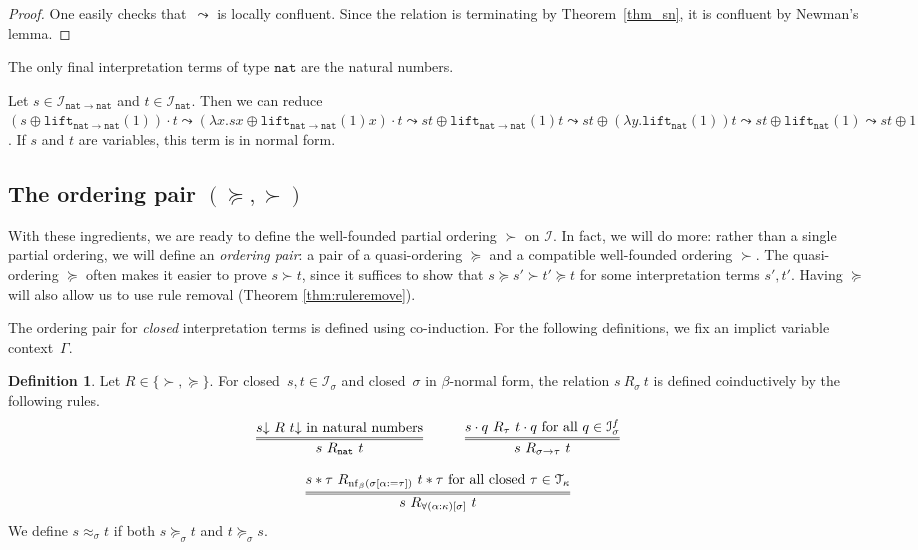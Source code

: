 \documentclass[a4paper,UKenglish,cleveref,autoref,numberwithinsect]{lipics-v2019}
\theoremstyle{definition}
\newtheorem{defn}[theorem]{Definition}
\newcommand{\Iterms}{\mathcal{I}}
\newcommand{\arrtype}{\rightarrow}
\newcommand{\app}[2]{#1 \cdot #2}
\newcommand{\tapp}[2]{#1 * #2}
\newcommand{\subst}[2]{#1:=#2}
\newcommand{\abs}[2]{\lambda #1.#2}
\newcommand{\arrW}{\leadsto}
\newcommand{\nat}{\mathtt{nat}}
\newcommand{\lift}{\mathtt{lift}}
\newcommand{\Tc}{\mathcal{T}}
\newcommand{\nf}{\mathrm{nf}}
\newcommand{\da}{\mathord{\downarrow}}
\begin{document}
\begin{proof}
  One easily
  checks that~$\arrW$ is locally confluent. Since the
  relation is
  terminating by Theorem~\ref{thm_sn}, it is confluent by Newman's
  lemma.
\end{proof}

\begin{lemma}\label{lem_final_nat}
  The only final interpretation terms of type $\nat$ are the natural
  numbers.
\end{lemma}

\begin{example}\label{ex:arrWreduce}
Let $s \in \Iterms_{\nat \arrtype \nat}$ and $t \in
\Iterms_\nat$. Then we can reduce
$(s \oplus \lift_{\nat \arrtype \nat}(1)) \cdot t \arrW
(\abs{x}{s x \oplus \lift_{\nat \arrtype \nat}(1)x}) \cdot t \arrW
s t \oplus \lift_{\nat \arrtype \nat}(1)t \arrW
s t \oplus (\abs{y}{\lift_{\nat}(1)})t \arrW
s t \oplus \lift_\nat(1) \arrW
s t \oplus 1$. If $s$ and $t$ are variables, this term is in normal
form.
\end{example}

\subsection{The ordering pair $(\succeq,\succ)$}\label{subsec:succ}

With these ingredients, we are ready to define the well-founded
partial ordering $\succ$ on $\Iterms$.  In fact, we will do more: rather
than a single partial ordering, we will define an \emph{ordering pair}: a
pair of a quasi-ordering $\succeq$ and a compatible well-founded ordering
$\succ$. The quasi-ordering $\succeq$ often makes it easier to prove
$s \succ t$, since it suffices to show that $s \succeq s' \succ t'
\succeq t$ for some interpretation terms $s',t'$.  Having $\succeq$ will
also allow us to use rule removal (Theorem \ref{thm:ruleremove}).

The ordering pair for \emph{closed} interpretation terms is
defined using co-induction. For the following definitions, we fix an
implict variable context~$\Gamma$.

\begin{defn}\label{def:succ}
  Let $R \in \{ \succ,\succeq \}$. For closed~$s,t\in\Iterms_\sigma$
  and closed~$\sigma$ in $\beta$-normal form, the relation
  $s\ R_{\sigma}\ t$ is defined coinductively by the following rules.
  \[
  \begin{array}{cc}
    \infer={s\ R_\nat\ t}{s\da\ R\ t\da \text{ in natural numbers}} \quad&\quad
    \infer={s\ R_{\sigma\arrtype\tau}\ t}{\app{s}{q}\ R_{\tau}\ \app{t}{q} \text{ for all } q \in \Iterms^f_\sigma} \\ \\
    \multicolumn{2}{c}{
    \infer={s\ R_{\forall(\alpha:\kappa)[\sigma]}\ t}{\tapp{s}{\tau}\ R_{\nf_\beta(\sigma[\subst{\alpha}{\tau}])}\ \tapp{t}{\tau} \text{ for all closed } \tau \in \Tc_{\kappa}}}
  \end{array}
  \]
  We define $s \approx_\sigma t$ if both $s \succeq_\sigma t$ and $t
  \succeq_\sigma s$.
\end{defn}
\end{document}
